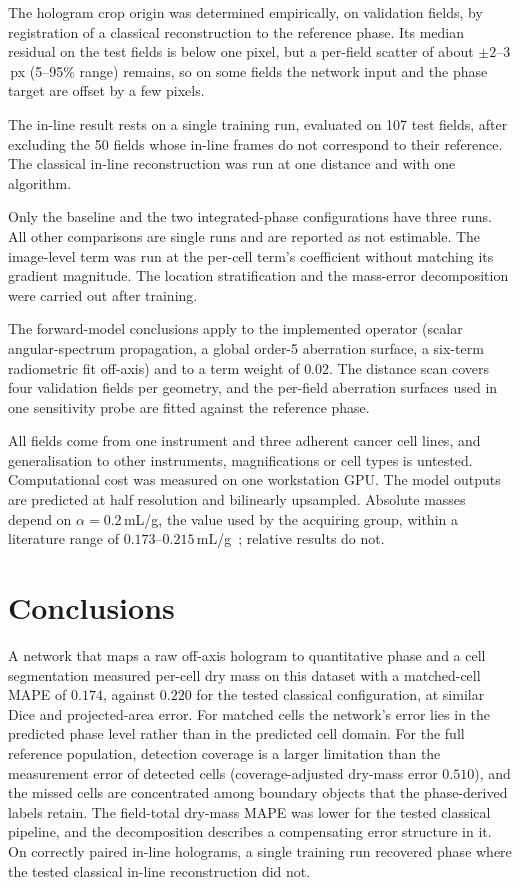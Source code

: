 \documentclass[11pt]{article}
\begin{document}
The hologram crop origin was determined empirically, on validation fields, by
registration of a classical reconstruction to the reference phase. Its median
residual on the test fields is below one pixel, but a per-field scatter of
about $\pm2$--$3$\,px (5--95\% range) remains, so on some fields the network
input and the phase target are offset by a few pixels.

The in-line result rests on a single training run, evaluated on 107 test
fields, after excluding the 50 fields whose in-line frames do not correspond to
their reference. The classical in-line reconstruction was run at one distance
and with one algorithm.

Only the baseline and the two integrated-phase configurations have three runs.
All other comparisons are single runs and are reported as not estimable. The
image-level term was run at the per-cell term's coefficient without matching
its gradient magnitude. The location stratification and the mass-error
decomposition were carried out after training.

The forward-model conclusions apply to the implemented operator (scalar
angular-spectrum propagation, a global order-5 aberration surface, a six-term
radiometric fit off-axis) and to a term weight of $0.02$. The distance scan
covers four validation fields per geometry, and the per-field aberration
surfaces used in one sensitivity probe are fitted against the reference phase.

All fields come from one instrument and three adherent cancer cell lines, and
generalisation to other instruments, magnifications or cell types is untested.
Computational cost was measured on one workstation GPU. The model outputs are
predicted at half resolution and bilinearly upsampled. Absolute masses depend
on $\alpha=0.2$\,mL/g, the value used by the acquiring group, within a
literature range of $0.173$--$0.215$\,mL/g~\cite{zhao2011,chaumet2024};
relative results do not.

\section{Conclusions}
\label{sec:conclusions}

A network that maps a raw off-axis hologram to quantitative phase and a cell
segmentation measured per-cell dry mass on this dataset with a matched-cell
MAPE of $0.174$, against $0.220$ for the tested classical configuration, at
similar Dice and projected-area error. For matched cells the network's error
lies in the predicted phase level rather than in the predicted cell domain. For
the full reference population, detection coverage is a larger limitation than
the measurement error of detected cells (coverage-adjusted dry-mass error
$0.510$), and the missed cells are concentrated among boundary objects that the
phase-derived labels retain. The field-total dry-mass MAPE was lower for the tested classical
pipeline, and the decomposition describes a compensating error structure in it. On correctly paired in-line holograms, a single training run recovered
phase where the tested classical in-line reconstruction did not.
\end{document}
